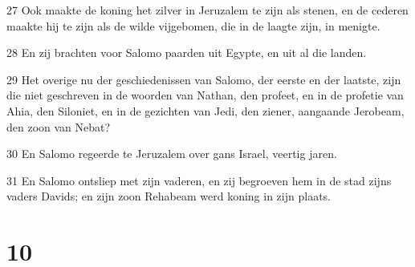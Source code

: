\par 27 Ook maakte de koning het zilver in Jeruzalem te zijn als stenen, en de cederen maakte hij te zijn als de wilde vijgebomen, die in de laagte zijn, in menigte.
\par 28 En zij brachten voor Salomo paarden uit Egypte, en uit al die landen.
\par 29 Het overige nu der geschiedenissen van Salomo, der eerste en der laatste, zijn die niet geschreven in de woorden van Nathan, den profeet, en in de profetie van Ahia, den Siloniet, en in de gezichten van Jedi, den ziener, aangaande Jerobeam, den zoon van Nebat?
\par 30 En Salomo regeerde te Jeruzalem over gans Israel, veertig jaren.
\par 31 En Salomo ontsliep met zijn vaderen, en zij begroeven hem in de stad zijns vaders Davids; en zijn zoon Rehabeam werd koning in zijn plaats.

\chapter{10}

